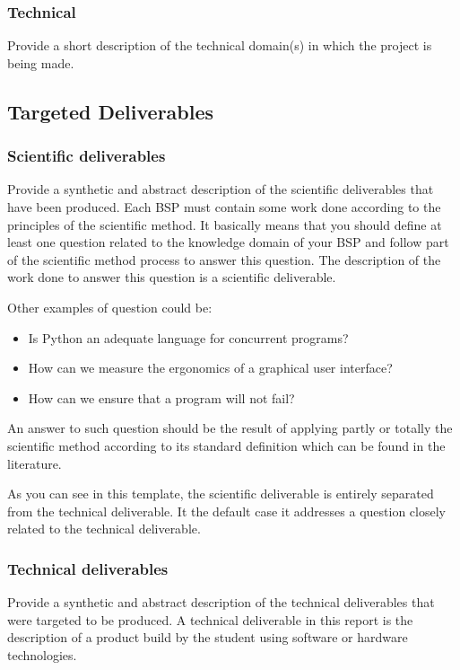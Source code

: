 \documentclass[conference,compsoc]{IEEEtran}
\begin{document}
\subsubsection{Technical}
Provide a short description of the technical domain(s) in which the project is being made.

\subsection{Targeted Deliverables}
\label{sec-deliverables}
\subsubsection{Scientific deliverables}
Provide a synthetic and abstract description of the scientific deliverables that have been produced. 
Each BSP must contain some work done according to the principles of the scientific method. It basically means that you should define at least one question related to the knowledge domain of your BSP and follow part of the scientific method process to answer this question. The description of the work done to answer this question is a scientific deliverable.

Other examples of question could be:
\begin{itemize}
	\item Is Python an adequate language for concurrent programs?
	\item How can we measure the ergonomics of a graphical user interface?
	\item How can we ensure that a program will not fail?
\end{itemize}

An answer to such question should be the result of applying partly or totally the scientific method according to its standard definition which can be found in the literature.

As you can see in this template, the scientific deliverable is entirely separated from the technical deliverable. It the default case it addresses a question closely related to the technical deliverable.  

\subsubsection{Technical deliverables}
Provide a synthetic and abstract description of the technical deliverables that were targeted to be produced. A technical deliverable in this report is the description of a product  build by the student using software or hardware technologies.
\end{document}
